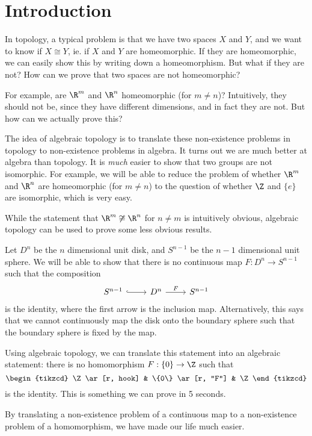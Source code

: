 \documentclass[a4paper]{article}
\begin{document}
\tableofcontents

\setcounter{section}{-1}
\section{Introduction}
In topology, a typical problem is that we have two spaces $X$ and $Y$, and we want to know if $X\cong Y$, ie. if $X$ and $Y$ are homeomorphic. If they are homeomorphic, we can easily show this by writing down a homeomorphism. But what if they are not? How can we prove that two spaces are not homeomorphic?

For example, are $\R^m$ and $\R^n$ homeomorphic (for $m\not= n$)? Intuitively, they should not be, since they have different dimensions, and in fact they are not. But how can we actually prove this?

The idea of algebraic topology is to translate these non-existence problems in topology to non-existence problems in algebra. It turns out we are much better at algebra than topology. It is \emph{much} easier to show that two groups are not isomorphic. For example, we will be able to reduce the problem of whether $\R^m$ and $\R^n$ are homeomorphic (for $m \not= n$) to the question of whether $\Z$ and $\{e\}$ are isomorphic, which is very easy.

While the statement that $\R^m \not\cong \R^n$ for $n \not= m$ is intuitively obvious, algebraic topology can be used to prove some less obvious results.

Let $D^n$ be the $n$ dimensional unit disk, and $S^{n - 1}$ be the $n-1$ dimensional unit sphere. We will be able to show that there is no continuous map $F: D^n \to S^{n - 1}$ such that the composition
\[
  \begin{tikzcd}
    S^{n - 1} \ar[r, hook] & D^n \ar[r, "F"] & S^{n - 1}
  \end{tikzcd}
\]
is the identity, where the first arrow is the inclusion map. Alternatively, this says that we cannot continuously map the disk onto the boundary sphere such that the boundary sphere is fixed by the map.

Using algebraic topology, we can translate this statement into an algebraic statement: there is no homomorphism $F: \{0\} \to \Z$ such that
\[
  \begin{tikzcd}
    \Z \ar[r, hook] & \{0\} \ar[r, "F"] & \Z
  \end{tikzcd}
\]
is the identity. This is something we can prove in 5 seconds.

By translating a non-existence problem of a continuous map to a non-existence problem of a homomorphism, we have made our life much easier.
\end{document}
